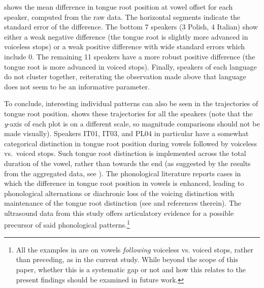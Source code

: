 \documentclass[12pt,]{article}
\let\rmarkdownfootnote\footnote%
\def\footnote{\protect\rmarkdownfootnote}
\begin{document}
 shows the mean difference in tongue root
position at vowel offset for each speaker, computed from the raw data.
The horizontal segments indicate the standard error of the difference.
The bottom 7 speakers (3 Polish, 4 Italian) show either a weak negative
difference (the tongue root is slightly more advanced in voiceless
stops) or a weak positive difference with wide standard errors which
include 0. The remaining 11 speakers have a more robust positive
difference (the tongue root is more advanced in voiced stops). Finally,
speakers of each language do not cluster together, reiterating the
observation made above that language does not seem to be an informative
parameter.

To conclude, interesting individual patterns can also be seen in the
trajectories of tongue root position.  shows
these trajectories for all the speakers (note that the \emph{y}-axis of
each plot is on a different scale, so magnitude comparisons should not
be made visually). Speakers IT01, IT03, and PL04 in particular have a
somewhat categorical distinction in tongue root position during vowels
followed by voiceless vs.~voiced stops. Such tongue root distinction is
implemented across the total duration of the vowel, rather than towards
the end (as suggested by the results from the aggregated data, see
). The phonological literature reports cases in which the
difference in tongue root position in vowels is enhanced, leading to
phonological alternations or diachronic loss of the voicing distinction
with maintenance of the tongue root distinction (see \citet{vaux1996}
and references therein). The ultrasound data from this study offers
articulatory evidence for a possible precursor of said phonological
patterns.\footnote{All the examples in \citet{vaux1996} are on vowels \textit{following} voiceless vs. voiced stops, rather than preceding, as in the current study. While beyond the scope of this paper, whether this is a systematic gap or not and how this relates to the present findings should be examined in future work.}
\end{document}
